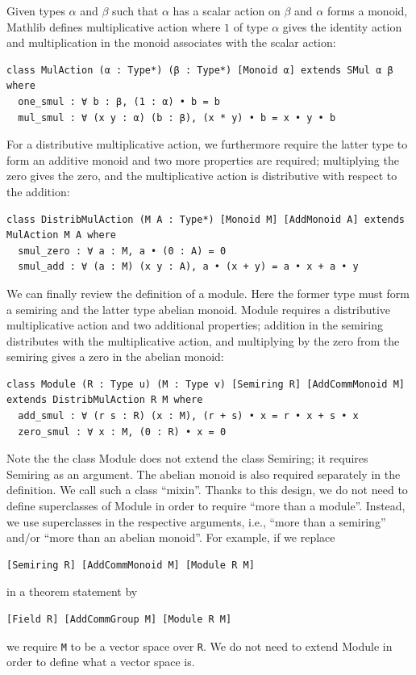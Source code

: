 \documentclass[]{article}
\renewcommand{\.}{\hskip .75pt}
\begin{document}
Given types $\alpha$ and $\beta$ such that $\alpha$ has a scalar action on $\beta$
and $\alpha$ forms a monoid, Mathlib defines multiplicative action where
$1$ of type $\alpha$ gives the identity action and multiplication in the monoid
associates with the scalar action:
\begin{lstlisting}
class MulAction (α : Type*) (β : Type*) [Monoid α] extends SMul α β where
  one_smul : ∀ b : β, (1 : α) • b = b
  mul_smul : ∀ (x y : α) (b : β), (x * y) • b = x • y • b
\end{lstlisting}
For a distributive multiplicative action, we furthermore require the latter type
to form an additive monoid and two more properties are required; multiplying the zero
gives the zero, and the multiplicative action is distributive with respect to the addition:
\begin{lstlisting}
class DistribMulAction (M A : Type*) [Monoid M] [AddMonoid A] extends MulAction M A where
  smul_zero : ∀ a : M, a • (0 : A) = 0
  smul_add : ∀ (a : M) (x y : A), a • (x + y) = a • x + a • y
\end{lstlisting}
We can finally review the definition of a module. Here the former type must form a semiring
and the latter type abelian monoid. Module requires a distributive multiplicative action and
two additional properties; addition in the semiring distributes with the multiplicative action,
and multiplying by the zero from the semiring gives a zero in the abelian monoid:
\begin{lstlisting}
class Module (R : Type u) (M : Type v) [Semiring R] [AddCommMonoid M] extends DistribMulAction R M where
  add_smul : ∀ (r s : R) (x : M), (r + s) • x = r • x + s • x
  zero_smul : ∀ x : M, (0 : R) • x = 0
\end{lstlisting}
Note the the class Module does not extend the class Semiring; it requires Semiring as an argument.
The abelian monoid is also required separately in the definition. We call such a class ``mixin''.
Thanks to this design, we do not need to define superclasses of Module in order to require
``more than a module''. Instead, we use superclasses in the respective arguments, i.e.,
``more than a semiring'' and/or ``more than an abelian monoid''. For example, if we replace
\begin{lstlisting}
[Semiring R] [AddCommMonoid M] [Module R M]
\end{lstlisting}
in a theorem statement by
\begin{lstlisting}
[Field R] [AddCommGroup M] [Module R M]
\end{lstlisting}
we require \texttt{M} to be a vector space over \texttt{R}. We do not need to extend
Module in order to define what a vector space is.
\end{document}
